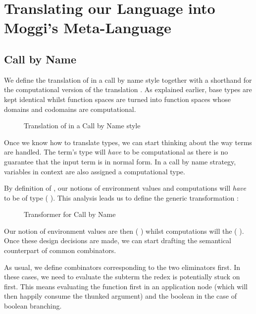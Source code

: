 \section{Translating our Language into Moggi's Meta-Language}

\subsection{Call by Name}

We define the translation  of  in a call by name style together
with a shorthand for the computational version of the translation . As
explained earlier, base types are kept identical whilst function spaces are turned
into function spaces whose domains and codomains are computational.

\begin{figure}[h]
\caption{Translation of  in a Call by Name style\label{fig:moggicbn}}
\end{figure}

Once we know how to translate types, we can start thinking about the way terms are
handled. The term's type will \emph{have} to be computational as there is no guarantee
that the input term is in normal form. In a call by name strategy, variables in context
are also assigned a computational type.

By definition of , our notions of environment values and computations
will \emph{have} to be of type ( ). This analysis leads us to
define the generic transformation :

\begin{figure}[h]
\caption{ Transformer for Call by Name\label{fig:cbntransformer}}
\end{figure}

Our notion of environment values are then ( )
whilst computations will the ( ). Once these
design decisions are made, we can start drafting the semantical counterpart of
common combinators.

As usual, we define combinators corresponding to the two eliminators first.
In these cases, we need to evaluate the subterm the redex is potentially
stuck on first. This means evaluating the function first in an application
node (which will then happily consume the thunked argument) and the boolean
in the case of boolean branching.

